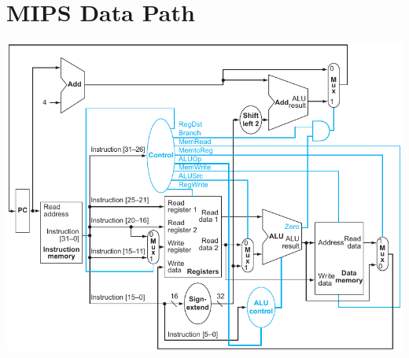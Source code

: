 \documentclass[10pt]{article}
\begin{document}
\begin{minipage}[t]{0.64\linewidth}
    \section*{MIPS Data Path}
    \centering
    \includegraphics[width=\linewidth]{content/fig417.pdf}
\end{minipage}
\end{document}
